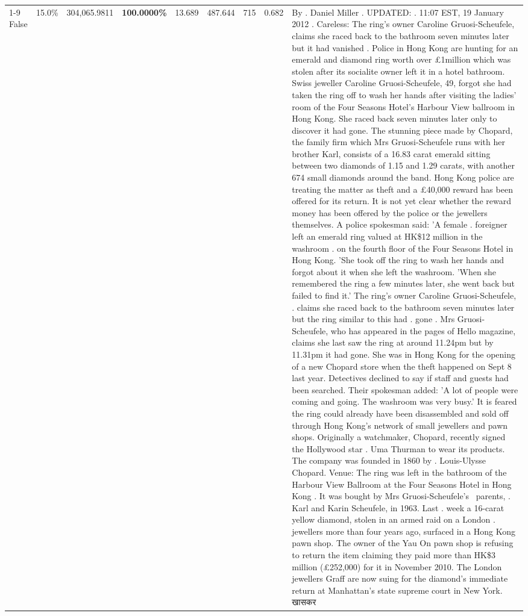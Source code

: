 \begin{table}[H]
\begin{tabular}{lllrlllll}
\cline{1-9}
False & 15.0\% & 304,065.9811 & \bfseries \color{red} 100.0000\% & 13.689 & 487.644 & 715 & 0.682 & By . Daniel Miller . UPDATED: . 11:07 EST, 19 January 2012 . Careless: The ring's owner Caroline Gruosi-Scheufele, claims she raced back to the bathroom seven minutes later but it had vanished . Police in Hong Kong are hunting for an emerald and diamond ring worth over £1million which was stolen after its socialite owner left it in a hotel bathroom. Swiss jeweller Caroline Gruosi-Scheufele, 49, forgot she had taken the ring off to wash her hands after visiting the ladies' room of the Four Seasons Hotel's Harbour View ballroom in Hong Kong. She raced back seven minutes later only to discover it had gone. The stunning piece made by Chopard, the family firm which Mrs Gruosi-Scheufele runs with her brother Karl, consists of a 16.83 carat emerald sitting between two diamonds of 1.15 and 1.29 carats, with another 674 small diamonds around the band. Hong Kong police are treating the matter as theft and a £40,000 reward has been offered for its return. It is not yet clear whether the reward money has been offered by the police or the jewellers themselves. A police spokesman said: 'A female . foreigner left an emerald ring valued at HK\$12 million in the washroom . on the fourth floor of the Four Seasons Hotel in Hong Kong. 'She took off the ring to wash her hands and forgot about it when she left the washroom. 'When she remembered the ring a few minutes later, she went back but failed to find it.' The ring's owner Caroline Gruosi-Scheufele, . claims she raced back to the bathroom seven minutes later but the ring similar to this had . gone . Mrs Gruosi-Scheufele, who has appeared in the pages of Hello magazine, claims she last saw the ring at around 11.24pm but by 11.31pm it had gone. She was in Hong Kong for the opening of a new Chopard store when the theft happened on Sept 8 last year. Detectives declined to say if staff and guests had been searched. Their spokesman added: 'A lot of people were coming and going. The washroom was very busy.' It is feared the ring could already have been disassembled and sold off through Hong Kong's network of small jewellers and pawn shops. Originally a watchmaker, Chopard, recently signed the Hollywood star . Uma Thurman to wear its products. The company was founded in 1860 by . Louis-Ulysse Chopard. Venue: The ring was left in the bathroom of the Harbour View Ballroom at the Four Seasons Hotel in Hong Kong . It was bought by Mrs Gruosi-Scheufele's  parents, . Karl and Karin Scheufele, in 1963. Last . week a 16-carat yellow diamond, stolen in an armed raid on a London . jewellers more than four years ago, surfaced in a Hong Kong pawn shop. The owner of the Yau On pawn shop is refusing to return the item claiming they paid more than HK\$3 million (£252,000) for it in November 2010. The London jewellers Graff are now suing for the diamond’s immediate return at Manhattan’s state supreme court in New York. खासकर \\

\end{tabular}
\end{table}
